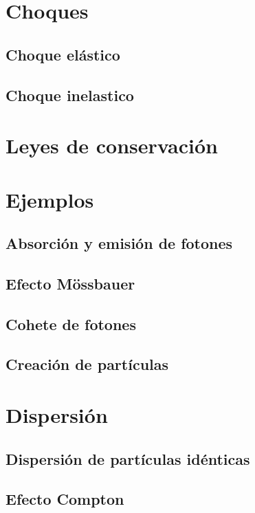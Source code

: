 \documentclass[../main]{subfiles}
\begin{document}
\chapter{Choques}

\section{Choque elástico}

\section{Choque inelastico}

\chapter{Leyes de conservación}

\chapter{Ejemplos}

\section{Absorción y emisión de fotones}

\section{Efecto M\"ossbauer}

\section{Cohete de fotones}

\section{Creación de partículas}

\chapter{Dispersión}

\section{Dispersión de partículas idénticas}

\section{Efecto Compton}
\end{document}
